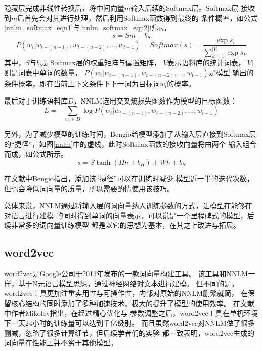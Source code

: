 \documentclass{standalone}
\begin{document}
隐藏层完成非线性转换后，将中间向量$m$输入后续的Softmax层。Softmax层
接收到$m$后首先会对其进行处理，然后利用Softmax函数得到最终的
条件概率，如公式\ref{nnlm_softmax_eqn1}与\ref{nnlm_softmax_eqn2}所示。
\begin{equation}
    s = Sm+b_S
    \label{nnlm_softmax_eqn1}
\end{equation}
\begin{equation}
    P\left ( w_i|w_{t-(n-1)},w_{t-(n-2)},...,w_{t-1} \right ) = 
    Softmax\left(s\right)=
    \frac{\exp s_i}{\sum_{k=1}^{|V|}\exp s_k}
    \label{nnlm_softmax_eqn2}
\end{equation}
其中，$S$与$b_S$是Softmax层的权重矩阵与偏置矩阵，
$V$表示语料库的统计词表，$|V|$则是词表中单词的数量，
$P\left ( w_i|w_{t-(n-1)},w_{t-(n-2)},...,w_{t-1} \right )$是模型
输出的条件概率，即在当前上下文条件下下一词为目标词$w_i$的概率。

最后对于训练语料库$D$，NNLM选用交叉熵损失函数作为模型的目标函数：
\begin{equation}
    L = -\sum_{w_t \in D}\log P\left ( w_t | w_{t-(n-1)},w_{t-(n-2)},...,w_{t-1} \right )
    \label{nnlm_loss_eqn}
\end{equation}


另外，为了减少模型的训练时间，Bengio给模型添加了从输入层直接到Softmax层
的“捷径”，如图\ref{nnlm}中的虚线，此时Softmax函数的接收向量将由两个
输入组合而成，如公式所示。
\begin{equation}
    s = S\tanh \left ( Hh+b_H \right ) + Wh + b_S
\end{equation}

在文献\cite{bengio2003neural}中Bengio指出，添加该“捷径”可以在训练时减少
模型近一半的迭代次数，但也会降低词向量的质量，所以需要酌情使用该技巧。

总体来说，NNLM通过将输入层的词向量纳入训练参数的方式，让模型在能够在对语言进行建模
的同时得到单词的向量表示，可以说是一个里程碑式的模型，后续非常多的词向量训练模型
都是以它的思想为基本，在其之上改进与拓展。


\subsection{word2vec}
\label{sect_word2vec}
word2vec是Google公司于2013年发布的一款词向量构建工具。
该工具和NNLM一样，基于N元语言模型思想，通过神经网络对文本进行建模。
但不同的是，word2vec工具更加注重实用性与可操作性，内部对原始的NNLM删繁就简，
在保留核心结构的同时添加了多种加速技术，极大的提升了模型的使用效率。
在文献\cite{mikolov2013distributed}中作者Mikolov指出，在经过精心优化与
参数调整之后，word2vec工具在单机环境下一天24小时的训练量可以达到千亿级别。
而且虽然word2vec对NNLM做了很多删减，忽略了很多计算细节，但后续学者们的实验
都一致表明，word2vec生成的词向量在性能上并不劣于其他模型。
\end{document}
